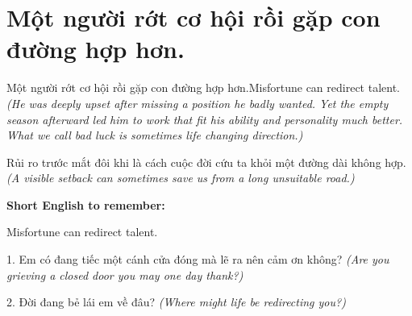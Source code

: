 \section{Một người rớt cơ hội rồi gặp con đường hợp hơn.}
\begin{truyen}{Một người rớt cơ hội rồi gặp con đường hợp hơn.}{Misfortune can redirect talent.}
\textit{(He was deeply upset after missing a position he badly wanted. Yet the empty season afterward led him to work that fit his ability and personality much better. What we call bad luck is sometimes life changing direction.)}
\end{truyen}
\begin{baihoc}
Rủi ro trước mắt đôi khi là cách cuộc đời cứu ta khỏi một đường dài không hợp.
\textit{(A visible setback can sometimes save us from a long unsuitable road.)}
\end{baihoc}
\begin{ghinhoanh}
\textbf{Short English to remember:}

Misfortune can redirect talent.
\end{ghinhoanh}
\begin{tuhocnhanh}
1. Em có đang tiếc một cánh cửa đóng mà lẽ ra nên cảm ơn không? \textit{(Are you grieving a closed door you may one day thank?)}

2. Đời đang bẻ lái em về đâu? \textit{(Where might life be redirecting you?)}
\end{tuhocnhanh}
\ngancach


